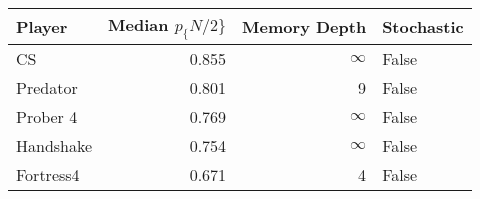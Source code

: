 \begin{tabular}{lrrl}
\toprule
    Player &  Median $p_\{N/2\}$ &  Memory Depth & Stochastic \\
\midrule
        CS &             0.855 &            \(\infty\) &      False \\
  Predator &             0.801 &             9 &      False \\
  Prober 4 &             0.769 &            \(\infty\) &      False \\
 Handshake &             0.754 &            \(\infty\) &      False \\
 Fortress4 &             0.671 &             4 &      False \\
\bottomrule
\end{tabular}
